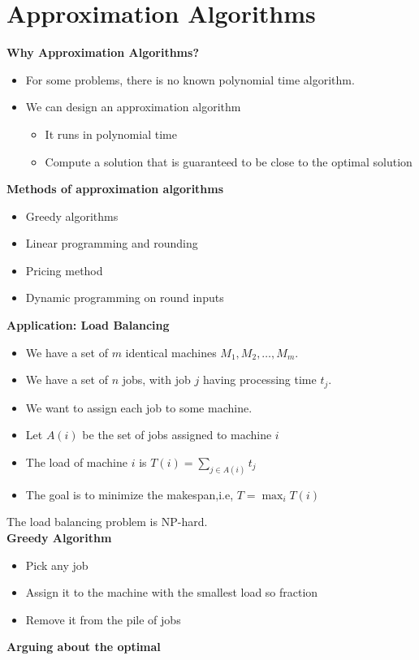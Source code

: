 \documentclass[onecolumn]{report}
\begin{document}
\section{Approximation Algorithms}
\textbf{Why Approximation Algorithms?}
\begin{itemize}
    \item For some problems, there is no known polynomial time algorithm.
    \item We can design an approximation algorithm
    \begin{itemize}
        \item It runs in polynomial time
        \item Compute a solution that is guaranteed to be close to the optimal solution
    \end{itemize}
\end{itemize}
\textbf{Methods of approximation algorithms}
\begin{itemize}
    \item Greedy algorithms
    \item Linear programming and rounding
    \item Pricing method
    \item Dynamic programming on round inputs
\end{itemize}
\textbf{Application: Load Balancing}
\begin{itemize}
    \item We have a set of $m$ identical machines $M_1, M_2, \dots, M_m$.
    \item We have a set of $n$ jobs, with job $j$ having processing time $t_j$.
    \item We want to assign each job to some machine.
    \item Let $A(i)$ be the set of jobs assigned to machine $i$
    \item The load of machine $i$ is $T(i) = \sum_{j \in A(i)} t_j$
    \item The goal is to minimize the makespan,i.e, $T=\max_i T(i)$
\end{itemize}
The load balancing problem is NP-hard.\\
\textbf{Greedy Algorithm}
\begin{itemize}
    \item Pick any job
    \item Assign it to the machine with the smallest load so fraction
    \item Remove it from the pile of jobs
\end{itemize}
\textbf{Arguing about the optimal}
\end{document}
